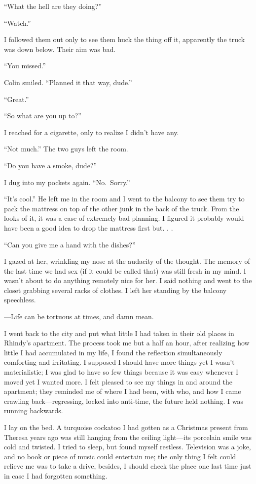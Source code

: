 ``What the hell are they doing?''

``Watch.''

I followed them out only to see them huck the thing off it, apparently
the truck was down below. Their aim was bad.

``You missed.''

Colin smiled. ``Planned it that way, dude.''

``Great.''

``So what are you up to?''

I reached for a cigarette, only to realize I didn't have any.

``Not much.'' The two guys left the room.

``Do you have a smoke, dude?''

I dug into my pockets again. ``No.~Sorry.''

``It's cool.'' He left me in the room and I went to the balcony to see
them try to pack the mattress on top of the other junk in the back of
the truck. From the looks of it, it was a case of extremely bad
planning. I figured it probably would have been a good idea to drop the
mattress first but. . .

``Can you give me a hand with the dishes?''

I gazed at her, wrinkling my nose at the audacity of the thought. The
memory of the last time we had sex (if it could be called that) was
still fresh in my mind. I wasn't about to do anything remotely nice for
her. I said nothing and went to the closet grabbing several racks of
clothes. I left her standing by the balcony speechless.

---Life can be tortuous at times, and damn mean.

I went back to the city and put what little I had taken in their old
places in Rhindy's apartment. The process took me but a half an hour,
after realizing how little I had accumulated in my life, I found the
reflection simultaneously comforting and irritating. I supposed I should
have more things yet I wasn't materialistic; I was glad to have so few
things because it was easy whenever I moved yet I wanted more. I felt
pleased to see my things in and around the apartment; they reminded me
of where I had been, with who, and how I came crawling
back---regressing, locked into anti-time, the future held nothing. I was
running backwards.

I lay on the bed. A turquoise cockatoo I had gotten as a Christmas
present from Theresa years ago was still hanging from the ceiling
light---its porcelain smile was cold and twisted. I tried to sleep, but
found myself restless. Television was a joke, and no book or piece of
music could entertain me; the only thing I felt could relieve me was to
take a drive, besides, I should check the place one last time just in
case I had forgotten something.

